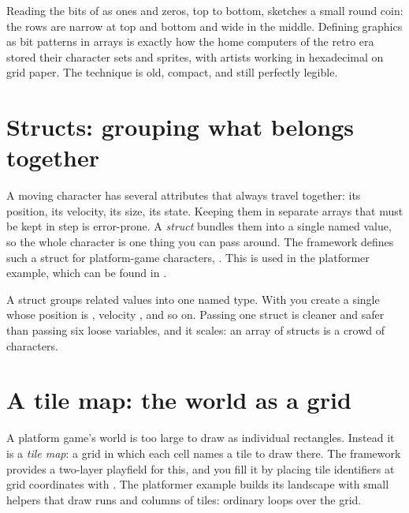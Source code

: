 \begin{prgaside}
Reading the bits of  as ones and zeros, top to bottom, sketches a
small round coin: the rows are narrow at top and bottom and wide in the middle.
Defining graphics as bit patterns in arrays is exactly how the home computers of
the retro era stored their character sets and sprites, with artists working in
hexadecimal on grid paper. The technique is old, compact, and still perfectly
legible.
\end{prgaside}

\section{Structs: grouping what belongs together}

A moving character has several attributes that always travel together: its
position, its velocity, its size, its state. Keeping them in separate arrays that
must be kept in step is error-prone. A \emph{struct} bundles them into a single
named value, so the whole character is one thing you can pass around. The framework
defines such a struct for platform-game characters, .
This is used in the platformer example, which can be found in 
\citep{prg32repo}.



\begin{prgconcept}
A struct groups related values into one named type. With
 you create a single  whose
position is , velocity , and so on. Passing one
struct is cleaner and safer than passing six loose variables, and it scales: an
array of structs is a crowd of characters.
\end{prgconcept}

\section{A tile map: the world as a grid}

A platform game's world is too large to draw as individual rectangles. Instead it
is a \emph{tile map}: a grid in which each cell names a tile to draw there. The
framework provides a two-layer playfield for this, and you fill it by placing tile
identifiers at grid coordinates with  \citep{prg32repo}.
The platformer example builds its landscape with small helpers that draw runs and
columns of tiles: ordinary loops over the grid.

